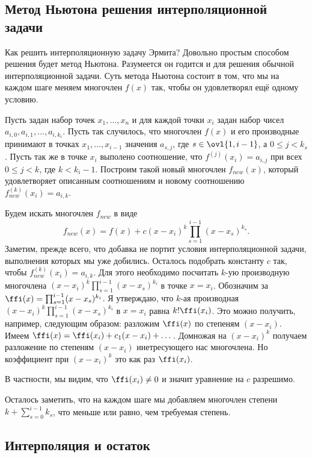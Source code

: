 \subsection{Метод Ньютона решения интерполяционной задачи}

Как решить интерполяционную задачу Эрмита? Довольно простым способом решения будет метод Ньютона. Разумеется он годится и для решения обычной интерполяционной задачи. Суть метода Ньютона состоит в том, что мы на каждом шаге меняем многочлен $f(x)$ так, чтобы он удовлетворял  ещё одному условию. 

Пусть задан набор точек $x_1,\dots, x_n$ и для каждой точки $x_i$ задан набор чисел $a_{i,0}, a_{i,1},\dots , a_{i,k_i}$. Пусть так случилось, что многочлен $f(x)$ и его производные принимают в точках $x_1,\dots,x_{i-1}$  значения $a_{s,j}$, где $s\in \ovl{1,i-1}$, а $0\leq j< k_s$. Пусть так же в точке $x_i$ выполено соотношение, что $f^{(j)}(x_i)=a_{i,j}$ при всех $0\leq j<k$, где $k<k_i-1$. Построим такой новый многочлен $f_{new}(x)$, который удовлетворяет описанным соотношениям и новому соотношению $f^{(k)}_{new}(x_i)=a_{i,k}$.

Будем искать многочлен $f_{new}$ в виде $$f_{new}(x)= f(x)+c (x-x_i)^k\prod_{s=1}^{i-1} (x-x_s)^{k_s}.$$
Заметим, прежде всего, что добавка не портит условия интерполяционной задачи, выполнения которых мы уже добились. Осталось подобрать константу $c$ так, чтобы $f^{(k)}_{new}(x_i)=a_{i,k}$. Для этого необходимо посчитать $k$-ую производную многочлена $(x-x_i)^k\prod_{s=1}^{i-1} (x-x_s)^{k_i}$  в точке $x=x_i$. Обозначим за $\ffi(x)=\prod_{s=1}^{i-1} (x-x_s)^{k_i}$. Я утверждаю, что $k$-ая производная $(x-x_i)^k\prod_{s=1}^{i-1} (x-x_s)^{k_i}$ в $x=x_i$ равна $k!\ffi(x_i)$. Это можно получить, например, следующим образом: разложим $\ffi(x)$ по степеням $(x-x_i)$. Имеем $\ffi(x)=\ffi(x_i)+c_1(x-x_i)+\dots$. Домножая на $(x-x_i)^k$ получаем разложение по степеням $(x-x_i)$ инетресующего нас многочлена. Но коэффициент при $(x-x_i)^k$ это как раз $\ffi(x_i)$. 

В частности, мы видим, что $\ffi(x_i)\neq 0$ и значит уравнение на $c$ разрешимо.

Осталось заметить, что на каждом шаге мы добавляем многочлен степени $k+\sum_{s=0}^{i-1} k_s$, что меньше или равно, чем требуемая степень.





\subsection{Интерполяция и остаток}

